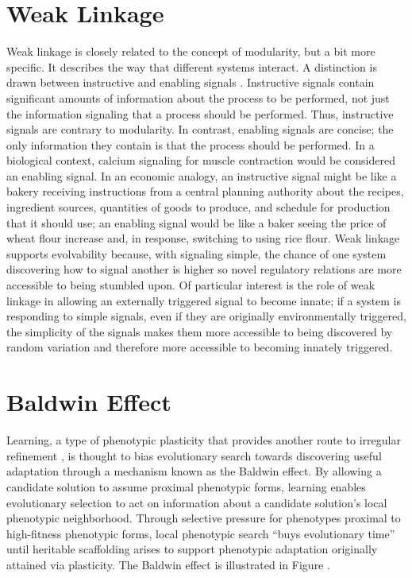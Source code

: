 \section{Weak Linkage}
Weak linkage is closely related to the concept of modularity, but a bit more specific. It describes the way that different systems interact. A distinction is drawn between instructive and enabling signals \cite[p 210]{Downing2015IntelligenceSystems}. Instructive signals contain significant amounts of information about the process to be performed, not just the information signaling that a process should be performed. Thus, instructive signals are contrary to modularity. In contrast, enabling signals are concise; the only information they contain is that the process should be performed. In a biological context, calcium signaling for muscle contraction would be considered an enabling signal. In an economic analogy, an instructive signal might be like a bakery receiving instructions from a central planning authority about the recipes, ingredient sources, quantities of goods to produce, and schedule for production that it should use; an enabling signal would be like a baker seeing the price of wheat flour increase and, in response, switching to using rice flour. Weak linkage supports evolvability because, with signaling simple, the chance of one system discovering how to signal another is higher so novel regulatory relations are more accessible to being stumbled upon. Of particular interest is the role of weak linkage in allowing an externally triggered signal to become innate; if a system is responding to simple signals, even if they are originally environmentally triggered, the simplicity of the signals makes them more accessible to being discovered by random variation and therefore more accessible to becoming innately triggered\cite[p 210]{Downing2015IntelligenceSystems}.



\section{Baldwin Effect}
Learning, a type of phenotypic plasticity that provides another route to irregular refinement \cite{Clune2011OnRegularity}, is thought to bias evolutionary search towards discovering useful adaptation through a mechanism known as the Baldwin effect.\cite{Downing2010TheNetworks} By allowing a candidate solution to assume proximal phenotypic forms, learning enables evolutionary selection to act on information about a candidate solution's local phenotypic neighborhood. Through selective pressure for phenotypes proximal to high-fitness phenotypic forms, local phenotypic search ``buys evolutionary time'' until heritable scaffolding arises to support phenotypic adaptation originally attained via plasticity.\cite{Downing2010TheNetworks} The Baldwin effect is illustrated in Figure .